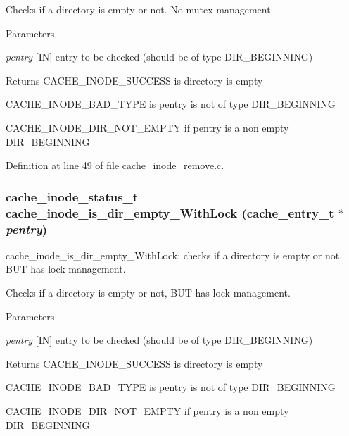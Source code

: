 Checks if a directory is empty or not. No mutex management


\begin{DoxyParams}{Parameters}
\item[{\em pentry}][IN] entry to be checked (should be of type DIR\_\-BEGINNING)\end{DoxyParams}
\begin{DoxyReturn}{Returns}
CACHE\_\-INODE\_\-SUCCESS is directory is empty\par
 

CACHE\_\-INODE\_\-BAD\_\-TYPE is pentry is not of type DIR\_\-BEGINNING\par
 

CACHE\_\-INODE\_\-DIR\_\-NOT\_\-EMPTY if pentry is a non empty DIR\_\-BEGINNING 
\end{DoxyReturn}


Definition at line 49 of file cache\_\-inode\_\-remove.c.
\subsubsection[{cache\_\-inode\_\-is\_\-dir\_\-empty\_\-WithLock}]{\setlength{\rightskip}{0pt plus 5cm}cache\_\-inode\_\-status\_\-t cache\_\-inode\_\-is\_\-dir\_\-empty\_\-WithLock (cache\_\-entry\_\-t $\ast$ {\em pentry})}\label{cache__inode__remove_8c_aae2de7c7798f173e1a0ff9bb79746fad}
cache\_\-inode\_\-is\_\-dir\_\-empty\_\-WithLock: checks if a directory is empty or not, BUT has lock management.

Checks if a directory is empty or not, BUT has lock management.


\begin{DoxyParams}{Parameters}
\item[{\em pentry}][IN] entry to be checked (should be of type DIR\_\-BEGINNING)\end{DoxyParams}
\begin{DoxyReturn}{Returns}
CACHE\_\-INODE\_\-SUCCESS is directory is empty\par
 

CACHE\_\-INODE\_\-BAD\_\-TYPE is pentry is not of type DIR\_\-BEGINNING\par
 

CACHE\_\-INODE\_\-DIR\_\-NOT\_\-EMPTY if pentry is a non empty DIR\_\-BEGINNING 
\end{DoxyReturn}


